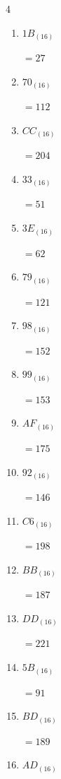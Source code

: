 \begin{multicols}{4}
\begin{enumerate}
        $=24$

  \item $1B_{(16)}$

        $=27$

  \item $70_{(16)}$

        $=112$

  \item $CC_{(16)}$

        $=204$

  \item $33_{(16)}$

        $=51$

  \item $3E_{(16)}$

        $=62$

  \item $79_{(16)}$

        $=121$

  \item $98_{(16)}$

        $=152$

  \item $99_{(16)}$

        $=153$

  \item $AF_{(16)}$

        $=175$

  \item $92_{(16)}$

        $=146$

  \item $C6_{(16)}$

        $=198$

  \item $BB_{(16)}$

        $=187$

\columnbreak %

\resetques

  \item $DD_{(16)}$

        $=221$

  \item $5B_{(16)}$

        $=91$

  \item $BD_{(16)}$

        $=189$

  \item $AD_{(16)}$


\end{enumerate}
\end{multicols}
